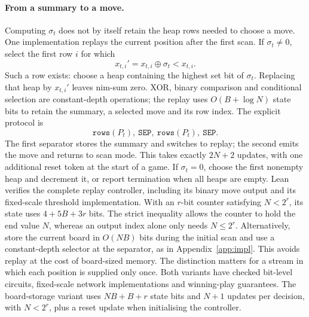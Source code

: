 \documentclass[11pt]{article}
\theoremstyle{plain}
\theoremstyle{definition}
\theoremstyle{remark}
\numberwithin{equation}{section}
\begin{document}
\paragraph{From a summary to a move.}
Computing $\sigma_t$ does not by itself retain the heap rows needed to choose a move. One implementation replays the current position after the first scan. If $\sigma_t\ne0$, select the first row $i$ for which
\[
x_{t,i}'=x_{t,i}\oplus\sigma_t<x_{t,i}.
\]
Such a row exists: choose a heap containing the highest set bit of $\sigma_t$. Replacing that heap by $x_{t,i}'$ leaves nim-sum zero. XOR, binary comparison and conditional selection are constant-depth operations; the replay uses $O(B+\log N)$ state bits to retain the summary, a selected move and its row index. The explicit protocol is
\[
\mathtt{rows}(P_t),\ \mathtt{SEP},\ \mathtt{rows}(P_t),\ \mathtt{SEP}.
\]
The first separator stores the summary and switches to replay; the second emits the move and returns to scan mode. This takes exactly $2N+2$ updates, with one additional reset token at the start of a game. If $\sigma_t=0$, choose the first nonempty heap and decrement it, or report termination when all heaps are empty. Lean verifies the complete replay controller, including its binary move output and its fixed-scale threshold implementation. With an $r$-bit counter satisfying $N<2^r$, its state uses $4+5B+3r$ bits. The strict inequality allows the counter to hold the end value $N$, whereas an output index alone only needs $N\le2^r$.
Alternatively, store the current board in $O(NB)$ bits during the initial scan and use a constant-depth selector at the separator, as in Appendix~\ref{app:impl}. This avoids replay at the cost of board-sized memory. The distinction matters for a stream in which each position is supplied only once. Both variants have checked bit-level circuits, fixed-scale network implementations and winning-play guarantees. The board-storage variant uses $NB+B+r$ state bits and $N+1$ updates per decision, with $N<2^r$, plus a reset update when initialising the controller.
\end{document}
